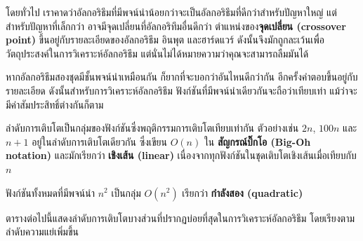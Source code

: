 
โดยทั่วไป เราคาดว่าอัลกอริธึมที่มีพจน์นำน้อยกว่าจะเป็นอัลกอริธึมที่ดีกว่าสำหรับปัญหาใหญ่ 
แต่สำหรับปัญหาที่เล็กกว่า อาจมีจุดเปลี่ยนที่อัลกอริทึมอื่นดีกว่า ตำแหน่งของ{\bf จุดเปลี่ยน (crossover point)} ขึ้นอยู่กับรายละเอียดของอัลกอริธึม อินพุต และฮาร์ดแวร์ 
ดังนั้นจึงมักถูกละเว้นเพื่อวัตถุประสงค์ในการวิเคราะห์อัลกอริธึม แต่นั่นไม่ได้หมายความว่าคุณจะสามารถลืมมันได้


หากอัลกอริธึมสองชุดมีชั้นพจน์นำเหมือนกัน ก็ยากที่จะบอกว่าอันไหนดีกว่ากัน อีกครั้งคำตอบขึ้นอยู่กับรายละเอียด 
ดังนั้นสำหรับการวิเคราะห์อัลกอริธึม ฟังก์ชันที่มีพจน์นำเดียวกันจะถือว่าเทียบเท่า แม้ว่าจะมีค่าสัมประสิทธิ์ต่างกันก็ตาม



ลำดับการเติบโตเป็นกลุ่มของฟังก์ชันซึ่งพฤติกรรมการเติบโตเทียบเท่ากัน ตัวอย่างเช่น $2n$, $100n$ และ $n+1$ อยู่ในลำดับการเติบโตเดียวกัน 
ซึ่งเขียน $O(n)$ ใน {\bf สัญกรณ์บิ๊กโอ (Big-Oh notation)} และมักเรียกว่า {\bf เชิงเส้น (linear)} เนื่องจากทุกฟังก์ชันในชุดเติบโตเชิงเส้นเมื่อเทียบกับ $n$


ฟังก์ชันทั้งหมดที่มีพจน์นำ $n^2$ เป็นกลุ่ม $O(n^2)$ เรียกว่า  {\bf กำลังสอง (quadratic)}

ตารางต่อไปนี้แสดงลำดับการเติบโตบางส่วนที่ปรากฏบ่อยที่สุดในการวิเคราะห์อัลกอริธึม โดยเรียงตามลำดับความแย่เพิ่มขึ้น


